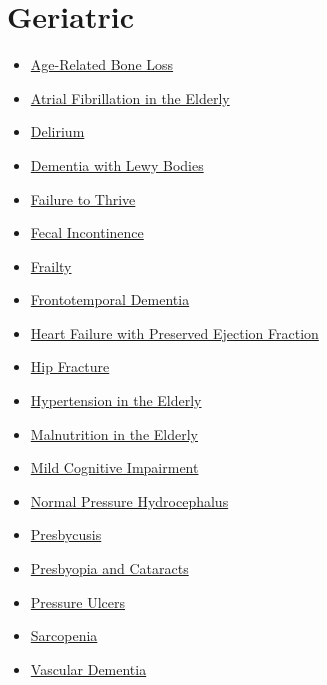 \section*{Geriatric}
\label{sec:organ_geriatric}
\begin{itemize}[noitemsep]
  \item \hyperlink{sec:Age-Related Bone Loss}{Age-Related Bone Loss}
  \item \hyperlink{sec:Atrial Fibrillation in the Elderly}{Atrial Fibrillation in the Elderly}
  \item \hyperlink{sec:Delirium}{Delirium}
  \item \hyperlink{sec:Dementia with Lewy Bodies}{Dementia with Lewy Bodies}
  \item \hyperlink{sec:Failure to Thrive}{Failure to Thrive}
  \item \hyperlink{sec:Fecal Incontinence}{Fecal Incontinence}
  \item \hyperlink{sec:Frailty}{Frailty}
  \item \hyperlink{sec:geriatric:Frontotemporal Dementia}{Frontotemporal Dementia}
  \item \hyperlink{sec:geriatric:Heart Failure with Preserved Ejection Fraction}{Heart Failure with Preserved Ejection Fraction}
  \item \hyperlink{sec:Hip Fracture}{Hip Fracture}
  \item \hyperlink{sec:Hypertension in the Elderly}{Hypertension in the Elderly}
  \item \hyperlink{sec:Malnutrition in the Elderly}{Malnutrition in the Elderly}
  \item \hyperlink{sec:Mild Cognitive Impairment}{Mild Cognitive Impairment}
  \item \hyperlink{sec:Normal Pressure Hydrocephalus}{Normal Pressure Hydrocephalus}
  \item \hyperlink{sec:Presbycusis}{Presbycusis}
  \item \hyperlink{sec:Presbyopia and Cataracts}{Presbyopia and Cataracts}
  \item \hyperlink{sec:Pressure Ulcers}{Pressure Ulcers}
  \item \hyperlink{sec:Sarcopenia}{Sarcopenia}
  \item \hyperlink{sec:Vascular Dementia}{Vascular Dementia}
\end{itemize}


